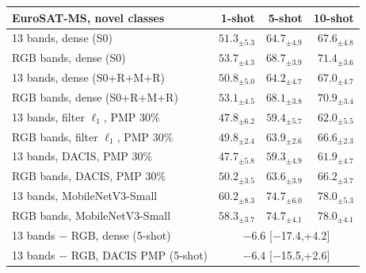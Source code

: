 \begin{tabular}{@{}lrrr@{}}
\toprule
EuroSAT-MS, novel classes & 1-shot & 5-shot & 10-shot \\
\midrule
13 bands, dense (S0) & $51.3_{\pm5.3}$ & $64.7_{\pm4.9}$ & $67.6_{\pm4.8}$ \\
RGB bands, dense (S0) & $53.7_{\pm4.3}$ & $68.7_{\pm3.9}$ & $71.4_{\pm3.6}$ \\
13 bands, dense (S0+R+M+R) & $50.8_{\pm5.0}$ & $64.2_{\pm4.7}$ & $67.0_{\pm4.7}$ \\
RGB bands, dense (S0+R+M+R) & $53.1_{\pm4.5}$ & $68.1_{\pm3.8}$ & $70.9_{\pm3.4}$ \\
13 bands, filter $\ell_1$, PMP 30\% & $47.8_{\pm6.2}$ & $59.4_{\pm5.7}$ & $62.0_{\pm5.5}$ \\
RGB bands, filter $\ell_1$, PMP 30\% & $49.8_{\pm2.4}$ & $63.9_{\pm2.6}$ & $66.6_{\pm2.3}$ \\
13 bands, DACIS, PMP 30\% & $47.7_{\pm5.8}$ & $59.3_{\pm4.9}$ & $61.9_{\pm4.7}$ \\
RGB bands, DACIS, PMP 30\% & $50.2_{\pm3.5}$ & $63.6_{\pm3.9}$ & $66.2_{\pm3.7}$ \\
13 bands, MobileNetV3-Small & $60.2_{\pm8.3}$ & $74.7_{\pm6.0}$ & $78.0_{\pm5.3}$ \\
RGB bands, MobileNetV3-Small & $58.3_{\pm3.7}$ & $74.7_{\pm4.1}$ & $78.0_{\pm4.1}$ \\
\midrule
13 bands $-$ RGB, dense (5-shot) & \multicolumn{3}{c}{$\ensuremath{-}6.6$ {\scriptsize[\ensuremath{-}17.4,+4.2]}} \\
13 bands $-$ RGB, DACIS PMP (5-shot) & \multicolumn{3}{c}{$\ensuremath{-}6.4$ {\scriptsize[\ensuremath{-}15.5,+2.6]}} \\
\bottomrule
\end{tabular}